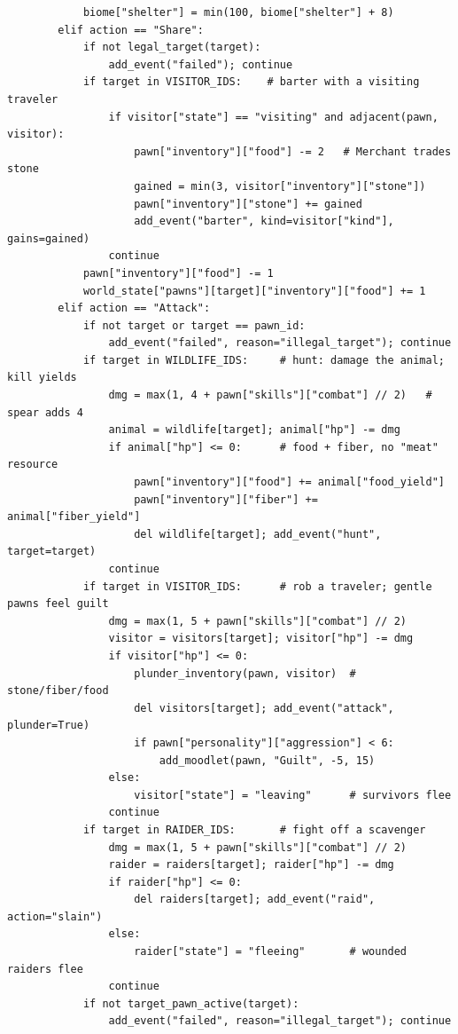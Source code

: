 \documentclass[10pt,a4paper]{article}
\begin{document}
\begin{lstlisting}
            biome["shelter"] = min(100, biome["shelter"] + 8)
        elif action == "Share":
            if not legal_target(target):
                add_event("failed"); continue
            if target in VISITOR_IDS:    # barter with a visiting traveler
                if visitor["state"] == "visiting" and adjacent(pawn, visitor):
                    pawn["inventory"]["food"] -= 2   # Merchant trades stone
                    gained = min(3, visitor["inventory"]["stone"])
                    pawn["inventory"]["stone"] += gained
                    add_event("barter", kind=visitor["kind"], gains=gained)
                continue
            pawn["inventory"]["food"] -= 1
            world_state["pawns"][target]["inventory"]["food"] += 1
        elif action == "Attack":
            if not target or target == pawn_id:
                add_event("failed", reason="illegal_target"); continue
            if target in WILDLIFE_IDS:     # hunt: damage the animal; kill yields
                dmg = max(1, 4 + pawn["skills"]["combat"] // 2)   # spear adds 4
                animal = wildlife[target]; animal["hp"] -= dmg
                if animal["hp"] <= 0:      # food + fiber, no "meat" resource
                    pawn["inventory"]["food"] += animal["food_yield"]
                    pawn["inventory"]["fiber"] += animal["fiber_yield"]
                    del wildlife[target]; add_event("hunt", target=target)
                continue
            if target in VISITOR_IDS:      # rob a traveler; gentle pawns feel guilt
                dmg = max(1, 5 + pawn["skills"]["combat"] // 2)
                visitor = visitors[target]; visitor["hp"] -= dmg
                if visitor["hp"] <= 0:
                    plunder_inventory(pawn, visitor)  # stone/fiber/food
                    del visitors[target]; add_event("attack", plunder=True)
                    if pawn["personality"]["aggression"] < 6:
                        add_moodlet(pawn, "Guilt", -5, 15)
                else:
                    visitor["state"] = "leaving"      # survivors flee
                continue
            if target in RAIDER_IDS:       # fight off a scavenger
                dmg = max(1, 5 + pawn["skills"]["combat"] // 2)
                raider = raiders[target]; raider["hp"] -= dmg
                if raider["hp"] <= 0:
                    del raiders[target]; add_event("raid", action="slain")
                else:
                    raider["state"] = "fleeing"       # wounded raiders flee
                continue
            if not target_pawn_active(target):
                add_event("failed", reason="illegal_target"); continue

\end{lstlisting}
\end{document}
